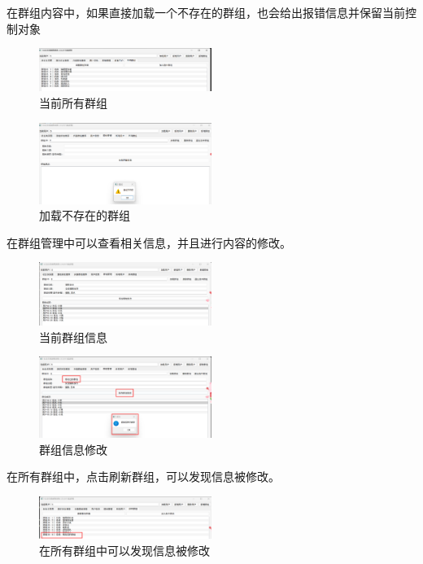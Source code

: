 \documentclass[12pt,a4paper]{article}
\begin{document}
在群组内容中，如果直接加载一个不存在的群组，也会给出报错信息并保留当前控制对象

\begin{figure}[H]
    \centering
    \includegraphics[width=0.5\textwidth]{pt2-31.png}
    \caption{当前所有群组}
\end{figure}

\begin{figure}[H]
    \centering
    \includegraphics[width=0.5\textwidth]{pt2-32.png}
    \caption{加载不存在的群组}
\end{figure}

在群组管理中可以查看相关信息，并且进行内容的修改。

\begin{figure}[H]
    \centering
    \includegraphics[width=0.5\textwidth]{pt2-33.png}
    \caption{当前群组信息}
\end{figure}

\begin{figure}[H]
    \centering
    \includegraphics[width=0.5\textwidth]{pt2-34.png}
    \caption{群组信息修改}
\end{figure}

在所有群组中，点击刷新群组，可以发现信息被修改。

\begin{figure}[H]
    \centering
    \includegraphics[width=0.5\textwidth]{pt2-35.png}
    \caption{在所有群组中可以发现信息被修改}
\end{figure}
\end{document}
